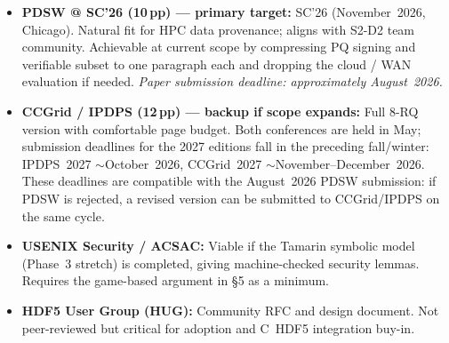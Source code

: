 \documentclass[11pt]{article}
\begin{document}
\begin{itemize}[nosep]
  \item \textbf{PDSW @ SC'26 (10\,pp) --- primary target:} SC'26 (November~2026,
    Chicago). Natural fit for HPC data provenance; aligns with S2-D2 team community.
    Achievable at current scope by compressing PQ signing and verifiable subset to
    one paragraph each and dropping the cloud / WAN evaluation if needed.
    \emph{Paper submission deadline: approximately August~2026.}
  \item \textbf{CCGrid / IPDPS (12\,pp) --- backup if scope expands:}
    Full 8-RQ version with comfortable page budget. Both conferences are
    held in May; submission deadlines for the 2027 editions fall in the
    preceding fall/winter: IPDPS~2027 $\sim$October~2026, CCGrid~2027
    $\sim$November--December~2026. These deadlines are compatible with
    the August~2026 PDSW submission: if PDSW is rejected, a revised
    version can be submitted to CCGrid/IPDPS on the same cycle.
  \item \textbf{USENIX Security / ACSAC:} Viable if the Tamarin symbolic model
    (Phase~3 stretch) is completed, giving machine-checked security lemmas. Requires
    the game-based argument in \S5 as a minimum.
  \item \textbf{HDF5 User Group (HUG):} Community RFC and design document. Not
    peer-reviewed but critical for adoption and C~HDF5 integration buy-in.
\end{itemize}




\end{document}
